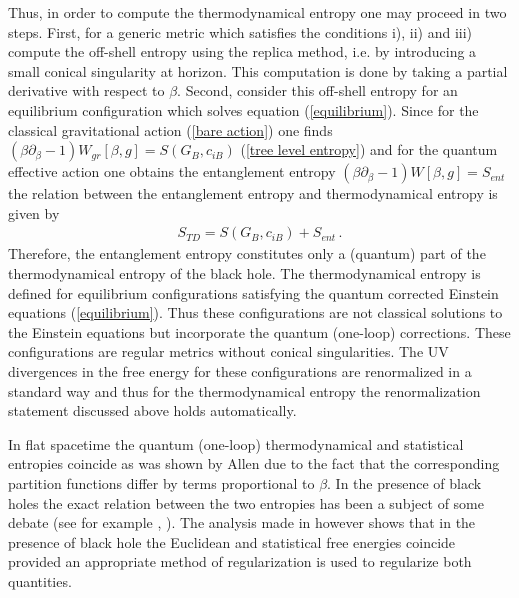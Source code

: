 \documentclass[12pt]{article}
\def\be{\begin{eqnarray}}
\def\ee{\end{eqnarray}}
\def\lb{\label}
\begin{document}
Thus, in order to compute the thermodynamical entropy one may proceed in two steps. First, for a generic metric which satisfies the conditions i), ii) and iii) compute the off-shell entropy using the replica method, i.e. by introducing a small conical singularity at horizon. This computation is done by taking a partial derivative with respect to $\beta$. Second, consider this off-shell entropy for an equilibrium configuration which solves equation (\ref{equilibrium}).
Since for the classical gravitational action (\ref{bare action}) one finds $(\beta\partial_\beta-1)W_{gr}[\beta, g]=S(G_B, c_{iB})$  (\ref{tree level entropy}) and for the quantum effective action one obtains the entanglement entropy  $(\beta\partial_\beta-1)W[\beta, g]=S_{ent}$ the relation between the entanglement entropy and thermodynamical entropy is given by  
\be
S_{TD}=S(G_B, c_{iB})+S_{ent}\, .
\lb{TD versus entanglement}
\ee
Therefore, the entanglement entropy constitutes only a (quantum) part of the thermodynamical entropy of the black hole. 
The thermodynamical entropy is defined for equilibrium configurations satisfying the quantum corrected Einstein equations (\ref{equilibrium}).
Thus these configurations are not classical solutions to the Einstein equations but incorporate the quantum (one-loop) corrections.
These configurations are regular metrics without conical singularities.  The UV divergences in the free energy for these configurations  are renormalized in a standard way and thus for the thermodynamical entropy the renormalization statement discussed above holds automatically. 
                  
                             
In flat spacetime the quantum (one-loop) thermodynamical and statistical entropies coincide as was shown by Allen \cite{Allen:1986qi} due to the fact that the corresponding partition functions  differ by  terms proportional to $\beta$. 
In the presence of black holes the exact relation between the two entropies
has been a subject of some debate (see for example \cite{Frolov:1994zi}, \cite{Solodukhin:1996vx}). The analysis made  in  \cite{Fursaev:1997th} however  shows 
that in the presence of black hole the Euclidean and statistical free energies coincide provided an appropriate method of regularization is used to regularize  both quantities. 
                             
\end{document}
